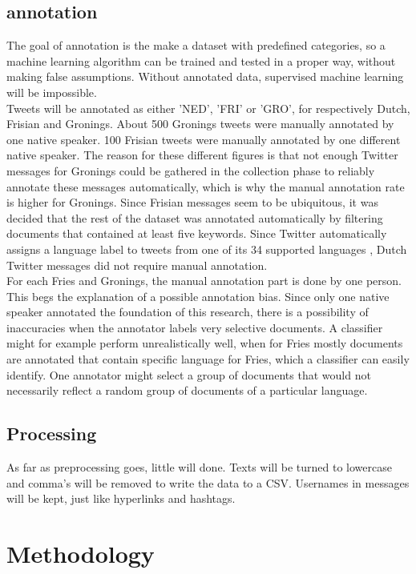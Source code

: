 \documentclass[
10pt, %
a4paper, %
oneside, %
headinclude,footinclude, %
] {book}%
\begin{document}
\section{annotation}
The goal of annotation is the make a dataset with predefined categories, so a machine learning algorithm can be trained and tested in a proper way, without making false assumptions. Without annotated data, supervised machine learning will be impossible.  \\
Tweets will be annotated as either 'NED', 'FRI' or 'GRO', for respectively Dutch, Frisian and Gronings. About 500 Gronings tweets were manually annotated by one native speaker. 100 Frisian tweets were manually annotated by one different native speaker. The reason for these different figures is that not enough Twitter messages for Gronings could be gathered in the collection phase to reliably annotate these messages automatically, which is why the manual annotation rate is higher for Gronings. Since Frisian messages seem to be ubiquitous, it was decided that the rest of the dataset was annotated automatically by filtering documents that contained at least five keywords. Since Twitter automatically assigns a language label to tweets from one of its 34 supported languages \citep{Hughes}, Dutch Twitter messages did not require manual annotation. \\
For each Fries and Gronings, the manual annotation part is done by one person. This begs the explanation of a possible annotation bias. Since only one native speaker annotated the foundation of this research, there is a possibility of inaccuracies when the annotator labels very selective documents. A classifier might for example perform unrealistically well, when for Fries mostly documents are annotated that contain specific language for Fries, which a classifier can easily identify. One annotator might select a group of documents that would not necessarily reflect a random group of documents of a particular language.

\section{Processing}
As far as preprocessing goes, little will done. Texts will be turned to lowercase and comma's will be removed to write the data to a CSV. Usernames in messages will be kept, just like hyperlinks and hashtags. 

\chapter{Methodology}
\end{document}
